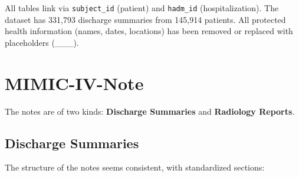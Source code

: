 \documentclass[11pt,a4paper]{article}
\newcommand{\field}[1]{\nolinkurl{#1}}
\begin{document}
\vspace{3mm}

All tables link via \field{subject\_id} (patient) and \field{hadm\_id} (hospitalization). The dataset has 331,793 discharge summaries from 145,914 patients. All protected health information (names, dates, locations) has been removed or replaced with placeholders (\_\_\_).

\section{MIMIC-IV-Note}

The notes are of two kinds: \textbf{Discharge Summaries} and \textbf{Radiology Reports}.

\subsection{Discharge Summaries}
\label{sec:note-structure}

The structure of the notes seems consistent, with standardized sections:
\end{document}
